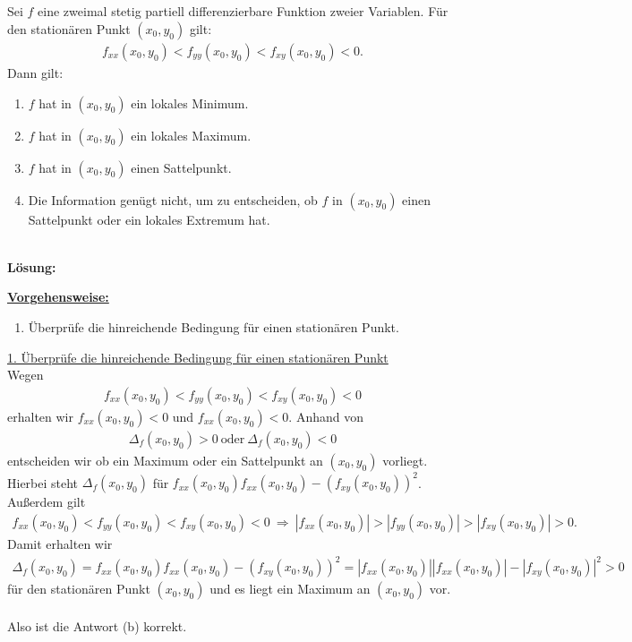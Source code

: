 \subsection*{}
Sei $ f $ eine zweimal stetig partiell differenzierbare Funktion zweier Variablen. Für den stationären Punkt $ (x_0,y_0) $ gilt:
\begin{align*}
	f_{xx}(x_0,y_0) < f_{yy}(x_0,y_0) < f_{xy}(x_0,y_0) < 0.
\end{align*} 
Dann gilt:
\renewcommand{\labelenumi}{(\alph{enumi})}
\begin{enumerate}
	\item $ f $ hat in $ (x_0,y_0) $ ein lokales Minimum.
	\item $ f $ hat in $ (x_0,y_0) $ ein lokales Maximum.
	\item $ f $ hat in $ (x_0,y_0) $ einen Sattelpunkt.
	\item Die Information genügt nicht, um zu entscheiden, ob $ f $ in $ (x_0,y_0) $ einen Sattelpunkt oder ein lokales Extremum hat.
\end{enumerate}
\ \\
\textbf{Lösung:}
\begin{mdframed}
	\underline{\textbf{Vorgehensweise:}}
	\renewcommand{\labelenumi}{\theenumi.}
	\begin{enumerate}
		\item Überprüfe die hinreichende Bedingung für einen stationären Punkt.
	\end{enumerate}
\end{mdframed}
\underline{1. Überprüfe die hinreichende Bedingung für einen stationären Punkt}\\
Wegen 
\begin{align*}
	f_{xx}(x_0,y_0) < f_{yy}(x_0,y_0) < f_{xy}(x_0,y_0) < 0
\end{align*}
erhalten wir $ f_{xx}(x_0,y_0)  < 0 $ und $  f_{xx}(x_0,y_0) <0 $. 
Anhand von 
\begin{align*}
	\Delta_f(x_0,y_0)  > 0 
	 \ \textrm{oder} \
	 \Delta_f(x_0,y_0) < 0 
\end{align*}
entscheiden wir ob ein Maximum oder ein Sattelpunkt an $ (x_0,y_0) $ vorliegt. 
Hierbei steht $ \Delta_f(x_0,y_0) $ für $ f_{xx}(x_0,y_0) f_{xx}(x_0,y_0) - ( f_{xy}(x_0,y_0))^2 $.
Außerdem gilt 
\begin{align*}
	f_{xx}(x_0,y_0) < f_{yy}(x_0,y_0) < f_{xy}(x_0,y_0) < 0
	\ \Rightarrow \
	|f_{xx}(x_0,y_0)| > |f_{yy}(x_0,y_0)| > |f_{xy}(x_0,y_0)| > 0.
\end{align*}
Damit erhalten wir  
\begin{align*}
	\Delta_f(x_0,y_0) =
	f_{xx}(x_0,y_0) f_{xx}(x_0,y_0) - ( f_{xy}(x_0,y_0))^2 
	=
	|f_{xx}(x_0,y_0)| |f_{xx}(x_0,y_0)| - | f_{xy}(x_0,y_0)|^2
	>0 
\end{align*}
für den stationären Punkt $ (x_0,y_0) $ und es liegt ein Maximum an $ (x_0,y_0) $ vor.\\
\\
Also ist die Antwort (b) korrekt.
\newpage
